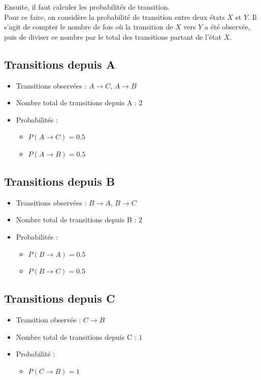 \documentclass[a4paper, 11pt]{report}
\begin{document}
Ensuite, il faut calculer les probabilités de transition. \\
Pour ce faire, on considère la probabilité de transition entre deux états \(X\) et \(Y\). Il s'agit de compter le nombre de fois où la transition de \(X\) vers \(Y\) a été observée, puis de diviser ce nombre par le total des transitions partant de l'état \(X\).

\subsection*{Transitions depuis A}
\begin{itemize}
    \item Transitions observées : \( A \rightarrow C \), \( A \rightarrow B \)
    \item Nombre total de transitions depuis A : \(2\)
    \item Probabilités :
    \begin{itemize}
        \item \( P(A \rightarrow C)  = 0.5 \)
        \item \( P(A \rightarrow B)  = 0.5 \)
    \end{itemize}
\end{itemize}

\subsection*{Transitions depuis B}
\begin{itemize}
    \item Transitions observées : \( B \rightarrow A \), \( B \rightarrow C \)
    \item Nombre total de transitions depuis B : \(2\)
    \item Probabilités :
    \begin{itemize}
        \item \( P(B \rightarrow A) = 0.5 \)
        \item \( P(B \rightarrow C) = 0.5 \)
    \end{itemize}
\end{itemize}

\subsection*{Transitions depuis C}
\begin{itemize}
    \item Transition observée : \( C \rightarrow B \)
    \item Nombre total de transitions depuis C : \(1\)
    \item Probabilité :
    \begin{itemize}
        \item \( P(C \rightarrow B) = 1 \)
    \end{itemize}
\end{itemize}
\end{document}
